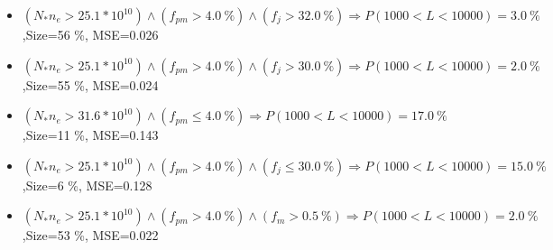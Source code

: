 \documentclass[numbered]{CSL}
\begin{document}
\begin{itemize}
\item $(N_* n_e > 25.1 * 10^{10}) \land (f_{pm} > 4.0~\%) \land (f_j > 32.0~\%) \Rightarrow P(1 000 < L < 10 000) = 3.0~\%$,\hfill Size=56 \%, MSE=0.026
\item $(N_* n_e > 25.1 * 10^{10}) \land (f_{pm} > 4.0~\%) \land (f_j > 30.0~\%) \Rightarrow P(1 000 < L < 10 000) = 2.0~\%$,\hfill Size=55 \%, MSE=0.024
\item $(N_* n_e > 31.6 * 10^{10}) \land (f_{pm} \leq 4.0~\%) \Rightarrow P(1 000 < L < 10 000) = 17.0~\%$,\hfill Size=11 \%, MSE=0.143
\item $(N_* n_e > 25.1 * 10^{10}) \land (f_{pm} > 4.0~\%) \land (f_j \leq 30.0~\%) \Rightarrow P(1 000 < L < 10 000) = 15.0~\%$,\hfill Size=6 \%, MSE=0.128
\item $(N_* n_e > 25.1 * 10^{10}) \land (f_{pm} > 4.0~\%) \land (f_m > 0.5~\%) \Rightarrow P(1 000 < L < 10 000) = 2.0~\%$,\hfill Size=53 \%, MSE=0.022
\end{itemize}
\end{document}

